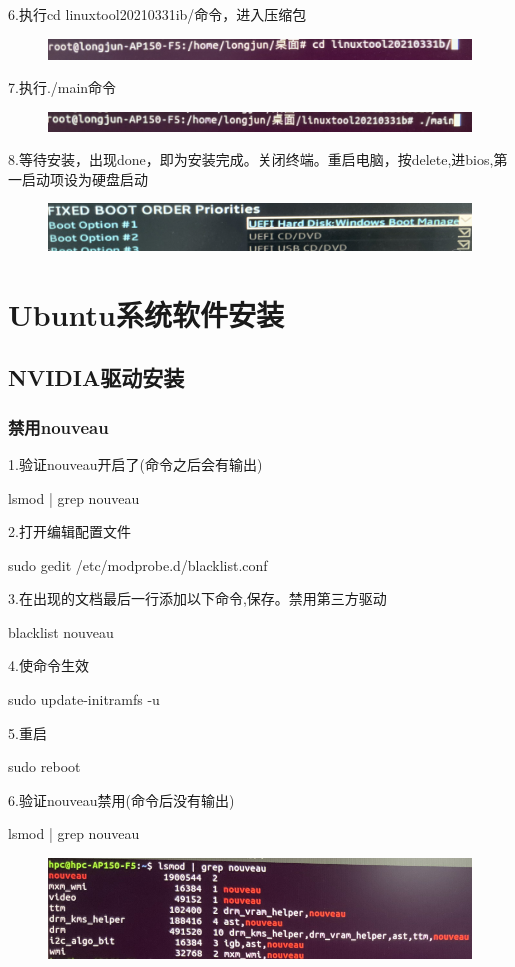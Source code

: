 \documentclass[openbib]{article}
\begin{document}
6.执行cd linuxtool20210331ib/命令，进入压缩包
\begin{figure}[H]
	\centering
	\includegraphics[scale=0.3]{44}
\end{figure}

7.执行./main命令
\begin{figure}[H]
	\centering
	\includegraphics[scale=0.3]{45}
\end{figure}

8.等待安装，出现done，即为安装完成。关闭终端。重启电脑，按delete,进bios,第一启动项设为硬盘启动
\begin{figure}[H]
	\centering
	\includegraphics[scale=0.3]{46}
\end{figure}

\section{Ubuntu系统软件安装}
\subsection{NVIDIA驱动安装}
\subsubsection{禁用nouveau}
1.验证nouveau开启了(命令之后会有输出)

lsmod | grep nouveau

2.打开编辑配置文件

sudo gedit /etc/modprobe.d/blacklist.conf

3.在出现的文档最后一行添加以下命令,保存。禁用第三方驱动

blacklist nouveau

4.使命令生效

sudo update-initramfs -u

5.重启

sudo reboot

6.验证nouveau禁用(命令后没有输出)

lsmod | grep nouveau

\begin{figure}[H]
	\centering
	\includegraphics[scale=0.3]{50}
\end{figure}
\end{document}
